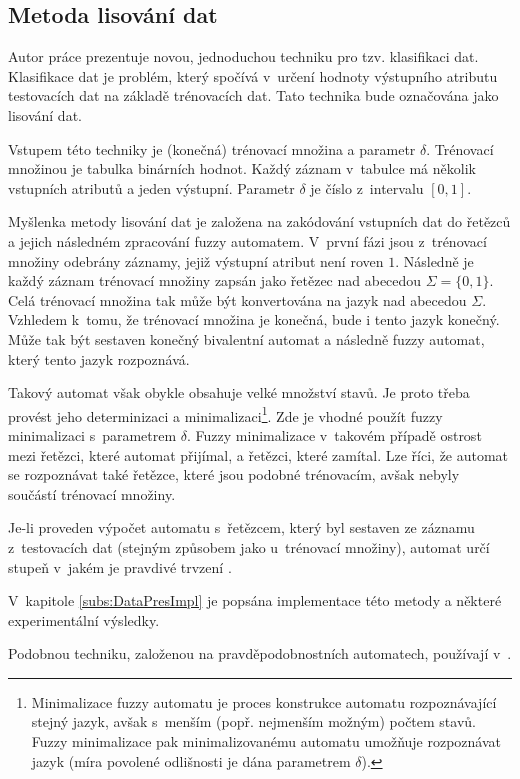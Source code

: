 \subsection{Metoda lisování dat} \label{subs:DataPresTech}

Autor práce prezentuje novou, jednoduchou techniku pro tzv. klasifikaci dat. Klasifikace dat je problém, který spočívá v~určení hodnoty výstupního atributu testovacích dat na základě trénovacích dat. Tato technika bude označována jako lisování dat.

Vstupem této techniky je (konečná) trénovací množina a parametr $\delta$. Trénovací množinou je tabulka binárních hodnot. Každý záznam v~tabulce má několik vstupních atributů a jeden výstupní. Parametr $\delta$ je číslo z~intervalu $[0,1]$.

Myšlenka metody lisování dat je založena na zakódování vstupních dat do řetězců a jejich následném zpracování fuzzy automatem. V~první fázi jsou z~trénovací množiny odebrány záznamy, jejiž výstupní atribut není roven $1$. Následně je každý záznam trénovací množiny zapsán jako řetězec nad abecedou $\Sigma = \{ 0, 1 \}$. Celá trénovací množina tak může být konvertována na jazyk nad abecedou $\Sigma$. Vzhledem k~tomu, že trénovací množina je konečná, bude i tento jazyk konečný. Může tak být sestaven konečný bivalentní automat a následně fuzzy automat, který tento jazyk rozpoznává.

Takový automat však obykle obsahuje velké množství stavů. Je proto třeba provést jeho determinizaci a minimalizaci\footnote{Minimalizace fuzzy automatu je proces konstrukce automatu rozpoznávající stejný jazyk, avšak s~menším (popř. nejmenším možným) počtem stavů. Fuzzy minimalizace pak minimalizovanému automatu umožňuje rozpoznávat jazyk  (míra povolené odlišnosti je dána parametrem $\delta$).}. Zde je vhodné použít fuzzy minimalizaci s~parametrem $\delta$. Fuzzy minimalizace v~takovém případě  ostrost mezi řetězci, které automat přijímal, a řetězci, které zamítal. Lze říci, že automat se  rozpoznávat také řetězce, které jsou podobné trénovacím, avšak nebyly součástí trénovací množiny.

Je-li proveden výpočet automatu s~řetězcem, který byl sestaven ze záznamu z~testovacích dat (stejným způsobem jako u~trénovací množiny), automat určí stupeň v~jakém je pravdivé trvzení .

V~kapitole \ref{subs:DataPresImpl} je popsána implementace této metody a některé experimentální výsledky.
\begin{note}
  Podobnou techniku, založenou na pravděpodobnostních automatech, používají v~\cite{Hac+-ProAnaLarFinStaMac}.
\end{note}


